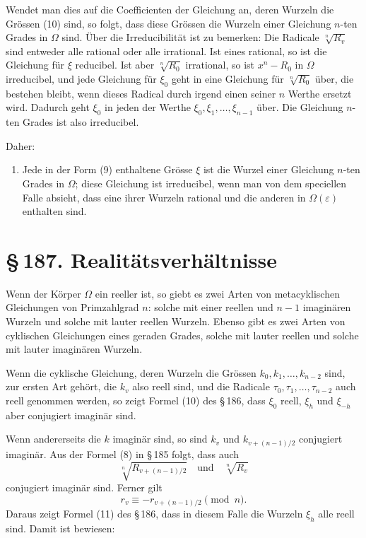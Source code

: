 \documentclass[11pt]{article}
\providecommand{\sect}[2]{\section*{\S\,#1. #2}}
\begin{document}
Wendet man dies auf die Coefficienten der Gleichung an, deren Wurzeln die Gr\"ossen (10) sind, so folgt, dass diese Gr\"ossen die Wurzeln einer Gleichung $n$-ten Grades in $\Omega$ sind. \"Uber die Irreducibilit\"at ist zu bemerken: Die Radicale $\sqrt[n]{R_v}$ sind entweder alle rational oder alle irrational. Ist eines rational, so ist die Gleichung f\"ur $\xi$ reducibel. Ist aber $\sqrt[n]{R_0}$ irrational, so ist $x^n-R_0$ in $\Omega$ irreducibel, und jede Gleichung f\"ur $\xi_0$ geht in eine Gleichung f\"ur $\sqrt[n]{R_0}$ \"uber, die bestehen bleibt, wenn dieses Radical durch irgend einen seiner $n$ Werthe ersetzt wird. Dadurch geht $\xi_0$ in jeden der Werthe $\xi_0,\xi_1,\ldots,\xi_{n-1}$ \"uber. Die Gleichung $n$-ten Grades ist also irreducibel.

Daher:

\begin{enumerate}[resume,label=\Roman*.]
\item Jede in der Form (9) enthaltene Gr\"osse $\xi$ ist die Wurzel einer Gleichung $n$-ten Grades in $\Omega$; diese Gleichung ist irreducibel, wenn man von dem speciellen Falle absieht, dass eine ihrer Wurzeln rational und die anderen in $\Omega(\varepsilon)$ enthalten sind.
\end{enumerate}

\sect{187}{Realit\"atsverh\"altnisse}

Wenn der K\"orper $\Omega$ ein reeller ist, so giebt es zwei Arten von metacyklischen Gleichungen von Primzahlgrad $n$: solche mit einer reellen und $n-1$ imagin\"aren Wurzeln und solche mit lauter reellen Wurzeln. Ebenso gibt es zwei Arten von cyklischen Gleichungen eines geraden Grades, solche mit lauter reellen und solche mit lauter imagin\"aren Wurzeln.

Wenn die cyklische Gleichung, deren Wurzeln die Gr\"ossen $k_0,k_1,\ldots,k_{n-2}$ sind, zur ersten Art geh\"ort, die $k_v$ also reell sind, und die Radicale $\tau_0,\tau_1,\ldots,\tau_{n-2}$ auch reell genommen werden, so zeigt Formel (10) des \S\,186, dass $\xi_0$ reell, $\xi_h$ und $\xi_{-h}$ aber conjugiert imagin\"ar sind.

Wenn andererseits die $k$ imagin\"ar sind, so sind $k_v$ und $k_{v+(n-1)/2}$ conjugiert imagin\"ar. Aus der Formel (8) in \S\,185 folgt, dass auch
\[
  \sqrt[n]{R_{v+(n-1)/2}}\quad\text{und}\quad \sqrt[n]{R_v}
\]
conjugiert imagin\"ar sind. Ferner gilt
\[
  r_v\equiv -r_{v+(n-1)/2}\pmod n.
\]
Daraus zeigt Formel (11) des \S\,186, dass in diesem Falle die Wurzeln $\xi_h$ alle reell sind. Damit ist bewiesen:
\end{document}
